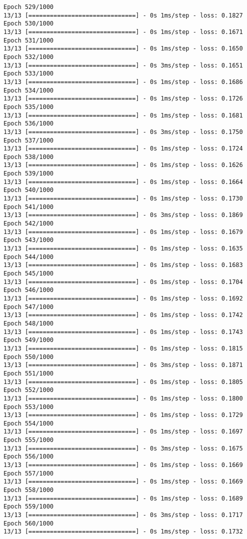 \documentclass[11pt]{article}
\begin{document}
\begin{Verbatim}[commandchars=\\\{\}]
Epoch 529/1000
13/13 [==============================] - 0s 1ms/step - loss: 0.1827
Epoch 530/1000
13/13 [==============================] - 0s 1ms/step - loss: 0.1671
Epoch 531/1000
13/13 [==============================] - 0s 1ms/step - loss: 0.1650
Epoch 532/1000
13/13 [==============================] - 0s 3ms/step - loss: 0.1651
Epoch 533/1000
13/13 [==============================] - 0s 1ms/step - loss: 0.1686
Epoch 534/1000
13/13 [==============================] - 0s 1ms/step - loss: 0.1726
Epoch 535/1000
13/13 [==============================] - 0s 1ms/step - loss: 0.1681
Epoch 536/1000
13/13 [==============================] - 0s 3ms/step - loss: 0.1750
Epoch 537/1000
13/13 [==============================] - 0s 1ms/step - loss: 0.1724
Epoch 538/1000
13/13 [==============================] - 0s 1ms/step - loss: 0.1626
Epoch 539/1000
13/13 [==============================] - 0s 1ms/step - loss: 0.1664
Epoch 540/1000
13/13 [==============================] - 0s 1ms/step - loss: 0.1730
Epoch 541/1000
13/13 [==============================] - 0s 3ms/step - loss: 0.1869
Epoch 542/1000
13/13 [==============================] - 0s 1ms/step - loss: 0.1679
Epoch 543/1000
13/13 [==============================] - 0s 1ms/step - loss: 0.1635
Epoch 544/1000
13/13 [==============================] - 0s 1ms/step - loss: 0.1683
Epoch 545/1000
13/13 [==============================] - 0s 1ms/step - loss: 0.1704
Epoch 546/1000
13/13 [==============================] - 0s 1ms/step - loss: 0.1692
Epoch 547/1000
13/13 [==============================] - 0s 1ms/step - loss: 0.1742
Epoch 548/1000
13/13 [==============================] - 0s 1ms/step - loss: 0.1743
Epoch 549/1000
13/13 [==============================] - 0s 1ms/step - loss: 0.1815
Epoch 550/1000
13/13 [==============================] - 0s 3ms/step - loss: 0.1871
Epoch 551/1000
13/13 [==============================] - 0s 1ms/step - loss: 0.1805
Epoch 552/1000
13/13 [==============================] - 0s 1ms/step - loss: 0.1800
Epoch 553/1000
13/13 [==============================] - 0s 1ms/step - loss: 0.1729
Epoch 554/1000
13/13 [==============================] - 0s 1ms/step - loss: 0.1697
Epoch 555/1000
13/13 [==============================] - 0s 3ms/step - loss: 0.1675
Epoch 556/1000
13/13 [==============================] - 0s 1ms/step - loss: 0.1669
Epoch 557/1000
13/13 [==============================] - 0s 1ms/step - loss: 0.1669
Epoch 558/1000
13/13 [==============================] - 0s 1ms/step - loss: 0.1689
Epoch 559/1000
13/13 [==============================] - 0s 3ms/step - loss: 0.1717
Epoch 560/1000
13/13 [==============================] - 0s 1ms/step - loss: 0.1732

\end{Verbatim}
\end{document}
